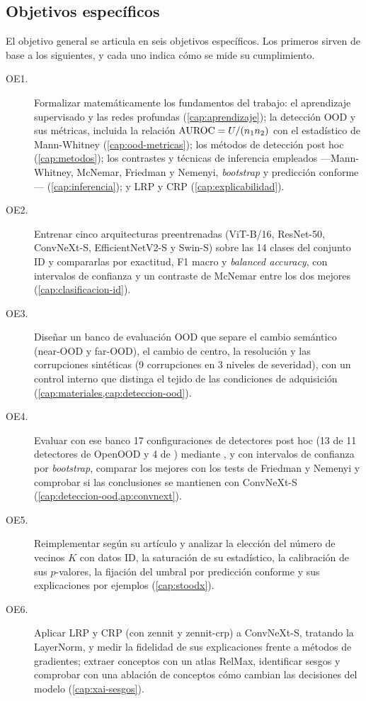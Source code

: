 \subsection{Objetivos específicos}\label{sec:objetivos-especificos}

El objetivo general se articula en seis objetivos específicos. Los primeros sirven de base a los siguientes, y cada uno indica cómo se mide su cumplimiento.

\begin{description}
  \item[OE1.] Formalizar matemáticamente los fundamentos del trabajo: el aprendizaje supervisado y las redes profundas (\cref{cap:aprendizaje}); la detección OOD y sus métricas, incluida la relación $\mathrm{AUROC} = U/(n_1 n_2)$ con el estadístico de Mann-Whitney (\cref{cap:ood-metricas}); los métodos de detección post hoc (\cref{cap:metodos}); los contrastes y técnicas de inferencia empleados ---Mann-Whitney, McNemar, Friedman y Nemenyi, \emph{bootstrap} y predicción conforme--- (\cref{cap:inferencia}); y LRP y CRP (\cref{cap:explicabilidad}).
  \item[OE2.] Entrenar cinco arquitecturas preentrenadas (ViT-B/16, ResNet-50, ConvNeXt-S, EfficientNetV2-S y Swin-S) sobre las 14 clases del conjunto ID y compararlas por exactitud, F1 macro y \emph{balanced accuracy}, con intervalos de confianza y un contraste de McNemar entre los dos mejores (\cref{cap:clasificacion-id}).
  \item[OE3.] Diseñar un banco de evaluación OOD que separe el cambio semántico (near-OOD y far-OOD), el cambio de centro, la resolución y las corrupciones sintéticas (9 corrupciones en 3 niveles de severidad), con un control interno que distinga el tejido de las condiciones de adquisición (\cref{cap:materiales,cap:deteccion-ood}).
  \item[OE4.] Evaluar con ese banco 17 configuraciones de detectores post hoc (13 de 11 detectores de OpenOOD y 4 de \stoodx) mediante \AUROC,  y  con intervalos de confianza por \emph{bootstrap}, comparar los mejores con los tests de Friedman y Nemenyi y comprobar si las conclusiones se mantienen con ConvNeXt-S (\cref{cap:deteccion-ood,ap:convnext}).
  \item[OE5.] Reimplementar \stoodx según su artículo y analizar la elección del número de vecinos $K$ con datos ID, la saturación de su estadístico, la calibración de sus $p$-valores, la fijación del umbral por predicción conforme y sus explicaciones por ejemplos (\cref{cap:stoodx}).
  \item[OE6.] Aplicar LRP y CRP (con zennit y zennit-crp) a ConvNeXt-S, tratando la LayerNorm, y medir la fidelidad de sus explicaciones frente a métodos de gradientes; extraer conceptos con un atlas RelMax, identificar sesgos y comprobar con una ablación de conceptos cómo cambian las decisiones del modelo (\cref{cap:xai-sesgos}).
\end{description}

